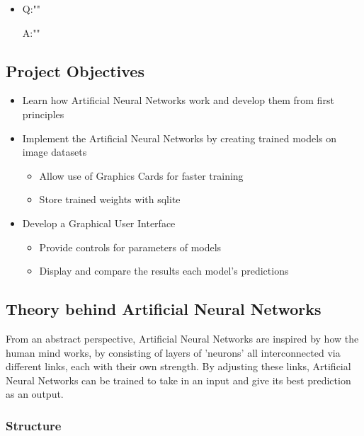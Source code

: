 \documentclass[./project-report/src/latex/project-report.tex]{subfiles}
\begin{document}
\begin{itemize}
    \item Q:""

          A:""
\end{itemize}

\subsection{Project Objectives}

\begin{itemize}
    \item Learn how Artificial Neural Networks work and develop them from first principles
    \item Implement the Artificial Neural Networks by creating trained models on image datasets
    \begin{itemize}
        \item Allow use of Graphics Cards for faster training
        \item Store trained weights with sqlite
    \end{itemize}
    \item Develop a Graphical User Interface
    \begin{itemize}
        \item Provide controls for parameters of models
        \item Display and compare the results each model's predictions
    \end{itemize}
\end{itemize}

\subsection{Theory behind Artificial Neural Networks}

From an abstract perspective, Artificial Neural Networks are inspired by how the human mind works, by consisting of layers of 'neurons' all interconnected via 
different links, each with their own strength. By adjusting these links, Artificial Neural Networks can be trained to take in an input and give its best 
prediction as an output.
\vspace{5mm}

\subsubsection{Structure}
\end{document}
